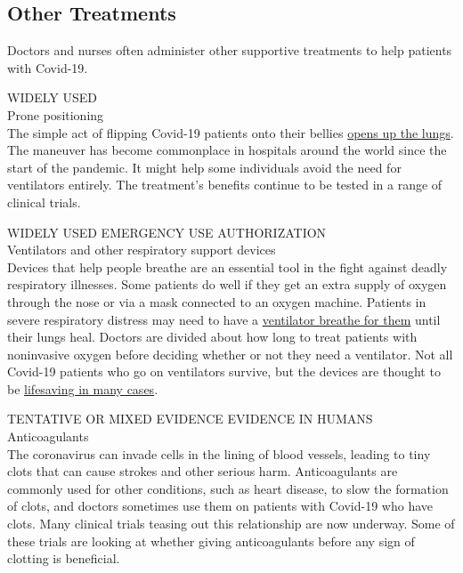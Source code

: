 \hypertarget{other-treatments}{%
\subsection{Other Treatments}\label{other-treatments}}

Doctors and nurses often administer other supportive treatments to help
patients with Covid-19.

WIDELY USED\\
Prone positioning\\
The simple act of flipping Covid-19 patients onto their bellies
\href{https://www.nytimes3xbfgragh.onion/2020/05/13/health/coronavirus-proning-lungs.html}{opens
up the lungs}. The maneuver has become commonplace in hospitals around
the world since the start of the pandemic. It might help some
individuals avoid the need for ventilators entirely. The treatment's
benefits continue to be tested in a range of clinical trials.

WIDELY USED EMERGENCY USE AUTHORIZATION\\
Ventilators and other respiratory support devices\\
Devices that help people breathe are an essential tool in the fight
against deadly respiratory illnesses. Some patients do well if they get
an extra supply of oxygen through the nose or via a mask connected to an
oxygen machine. Patients in severe respiratory distress may need to have
a
\href{https://www.nytimes3xbfgragh.onion/interactive/2020/05/08/health/coronavirus-covid-lungs-ventilators.html}{ventilator
breathe for them} until their lungs heal. Doctors are divided about how
long to treat patients with noninvasive oxygen before deciding whether
or not they need a ventilator. Not all Covid-19 patients who go on
ventilators survive, but the devices are thought to be
\href{https://www.nytimes3xbfgragh.onion/2020/04/26/health/coronavirus-patient-ventilator.html}{lifesaving
in many cases}.

TENTATIVE OR MIXED EVIDENCE EVIDENCE IN HUMANS\\
Anticoagulants\\
The coronavirus can invade cells in the lining of blood vessels, leading
to tiny clots that can cause strokes and other serious harm.
Anticoagulants are commonly used for other conditions, such as heart
disease, to slow the formation of clots, and doctors sometimes use them
on patients with Covid-19 who have clots. Many clinical trials teasing
out this relationship are now underway. Some of these trials are looking
at whether giving anticoagulants before any sign of clotting is
beneficial.

